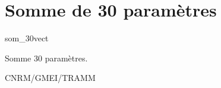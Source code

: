 %
\section{Somme de 30 param\`etres}

 {\sf som\_30vect}

Somme 30 param\`etres.

\bigskip





CNRM/GMEI/TRAMM

